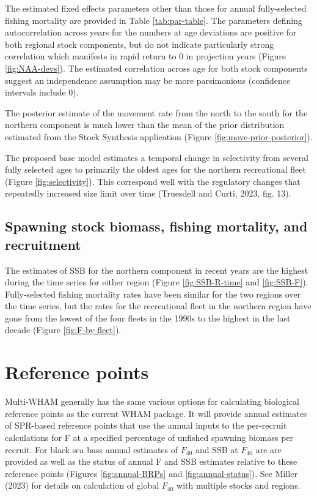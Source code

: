 \documentclass[
]{article}
\begin{document}
The estimated fixed effects parameters other than those for annual fully-selected fishing mortality are provided in Table \ref{tab:par-table}. The parameters defining autocorrelation across years for the numbers at age deviations are positive for both regional stock components, but do not indicate particularly strong correlation which manifests in rapid return to 0 in projection years (Figure \ref{fig:NAA-devs}). The estimated correlation across age for both stock components suggest an independence assumption may be more parsimonious (confidence intervals include 0).

The posterior estimate of the movement rate from the north to the south for the northern component is much lower than the mean of the prior distribution estimated from the Stock Synthesis application (Figure \ref{fig:move-prior-posterior}).

The proposed base model estimates a temporal change in selectivity from several fully selected ages to primarily the oldest ages for the northern recreational fleet (Figure \ref{fig:selectivity}). This correspond well with the regulatory changes that repeatedly increased size limit over time (Truesdell and Curti, 2023, fig. 13).

\hypertarget{spawning-stock-biomass-fishing-mortality-and-recruitment}{%
\subsection{Spawning stock biomass, fishing mortality, and recruitment}\label{spawning-stock-biomass-fishing-mortality-and-recruitment}}

The estimates of SSB for the northern component in recent years are the highest during the time series for either region (Figure \ref{fig:SSB-R-time} and \ref{fig:SSB-F}). Fully-selected fishing mortality rates have been similar for the two regions over the time series, but the rates for the recreational fleet in the northern region have gone from the lowest of the four fleets in the 1990s to the highest in the last decade (Figure \ref{fig:F-by-fleet}).

\hypertarget{reference-points}{%
\section{Reference points}\label{reference-points}}

Multi-WHAM generally has the same various options for calculating biological reference points as the current WHAM package. It will provide annual estimates of SPR-based reference points that use the annual inputs to the per-recruit calculations for F at a specified percentage of unfished spawning biomass per recruit. For black sea bass annual estimates of \(F_{40}\) and SSB at \(F_{40}\) are are provided as well as the status of annual F and SSB estimates relative to these reference points (Figures \ref{fig:annual-BRPs} and \ref{fig:annual-status}). See Miller (2023) for details on calculation of global \(F_{40}\) with multiple stocks and regions.
\end{document}
